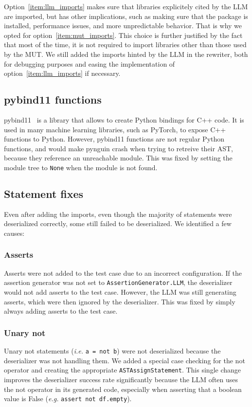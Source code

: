 \documentclass{article}
\begin{document}
Option~\ref{item:llm_imports} makes sure that libraries explicitely cited by the LLM are imported, but has other implications, such as making sure that the package is installed, performance issues, and more unpredictable behavior.
That is why we opted for option~\ref{item:mut_imports}. This choice is further justified by the fact that most of the time, it is not required to import libraries other than those used by the MUT. We still added the imports hinted by the LLM in the rewriter, both for debugging purposes and easing the implementation of option~\ref{item:llm_imports} if necessary.

\subsection{pybind11 functions}
pybind11~\cite{pybind11} is a library that allows to create Python bindings for C++ code. It is used in many machine learning libraries, such as PyTorch, to expose C++ functions to Python.
However, pybind11 functions are not regular Python functions, and would make pynguin crash when trying to retreive their AST, because they reference an unreachable module.
This was fixed by setting the module tree to \texttt{None} when the module is not found.

\subsection{Statement fixes}
Even after adding the imports, even though the majority of statements were deserialized correctly, some still failed to be deserialized. We identified a few causes:

\subsubsection{Asserts}
Asserts were not added to the test case due to an incorrect configuration. If the assertion generator was not set to \texttt{AssertionGenerator.LLM}, the deserializer would not add asserts to the test case. However, the LLM was still generating asserts, which were then ignored by the deserializer. This was fixed by simply always adding asserts to the test case.

\subsubsection{Unary not}
Unary not statements (\textit{i.e.} \texttt{a = not b}) were not deserialized because the deserializer was not handling them. We added a special case checking for the not operator and creating the appropriate \texttt{ASTAssignStatement}.
This single change improves the deserializer success rate significantly because the LLM often uses the not operator in its generated code, especially when asserting that a boolean value is False (\textit{e.g.} \texttt{assert not df.empty}).
\end{document}
